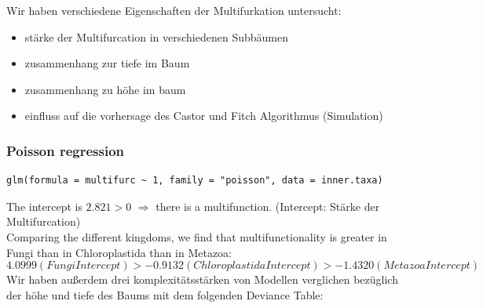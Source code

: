       Wir haben verschiedene Eigenschaften der Multifurkation untersucht:
      \begin{itemize}
        \item stärke der Multifurcation in verschiedenen Subbäumen
        \item zusammenhang zur tiefe im Baum
        \item zusammenhang zu höhe im baum
        \item einfluss auf die vorhersage des Castor und Fitch Algorithmus (Simulation) 
      \end{itemize}

      \subsubsection{Poisson regression}
      
        \begin{lstlisting}[gobble=8]
          glm(formula = multifurc ~ 1, family = "poisson", data = inner.taxa)
        \end{lstlisting}
        The intercept is $2.821 > 0$ $\Rightarrow$ there is a multifunction.
        (Intercept: Stärke der Multifurcation) \\
        Comparing the different kingdoms, we find that multifunctionality is greater in Fungi than in 
        Chloroplastida than in Metazoa:
        $$4.0999 (Fungi Intercept) > -0.9132 (Chloroplastida Intercept) > -1.4320 (Metazoa Intercept)$$
        Wir haben außerdem drei komplexitätsstärken von Modellen verglichen bezüglich der höhe und tiefe 
          des Baums mit dem folgenden Deviance Table:

